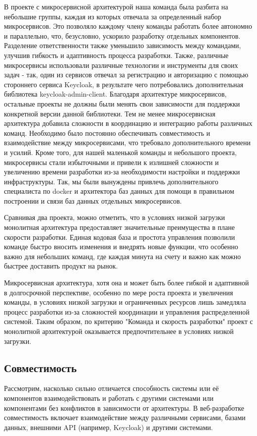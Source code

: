     В проекте с микросервисной архитектурой наша команда была разбита на небольшие группы, каждая из которых отвечала за определенный набор микросервисов. Это позволяло каждому члену команды работать более автономно и параллельно, что, безусловно, ускорило разработку отдельных компонентов. Разделение ответственности также уменьшило зависимость между командами, улучшив гибкость и адаптивность процесса разработки. Также, различные микросервисы использовали различные технологии и инструменты для своих задач - так, один из сервисов отвечал за регистрацию и авторизацию с помощью стороннего сервиса Keycloak, в результате чего потребовались дополнительная библиотека keycloak-admin-client. Благодаря архитектуре микросервисов, остальные проекты не должны были менять свои зависимости для поддержки конкретной версии данной библиотеки. Тем не менее микросервисная архитектура добавила сложности в координацию и интеграцию работы различных команд. Необходимо было постоянно обеспечивать совместимость и взаимодействие между микросервисами, что требовало дополнительного времени и усилий. Кроме того, для нашей маленькой команды и небольшого проекта, микросервисы стали избыточными и привели к излишней сложности и увеличению времени разработки из-за необходимости настройки и поддержки инфраструктуры. Так, мы были вынуждены привлечь дополнительного специалиста по docker и архитектора баз данных для помощи в правильном построении и связи баз данных отдельных микросервисов.
    
    Сравнивая два проекта, можно отметить, что в условиях низкой загрузки монолитная архитектура предоставляет значительные преимущества в плане скорости разработки. Единая кодовая база и простота управления позволили команде быстро вносить изменения и внедрять новые функции, что особенно важно для небольших команд, где каждая минута на счету и важно как можно быстрее доставить продукт на рынок.
    
    Микросервисная архитектура, хотя она и может быть более гибкой и адаптивной в долгосрочной перспективе, особенно по мере роста проекта и увеличения команды, в условиях низкой загрузки и ограниченных ресурсов лишь замедляла процесс разработки из-за сложностей координации и управления распределенной системой. Таким образом, по критерию "Команда и скорость разработки" проект с монолитной архитектурой оказывается предпочтительнее в условиях низкой загрузки.

\subsection{Совместимость}
    Рассмотрим, насколько сильно отличается способность системы или её компонентов взаимодействовать и работать с другими системами или компонентами без конфликтов в зависимости от архитектуры. В веб-разработке совместимость включает взаимодействие между различными сервисами, базами данных, внешними API (например, Keycloak) и другими системами.

